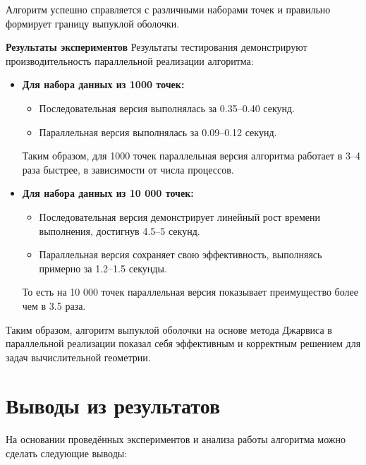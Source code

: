 \documentclass[a4paper,12pt]{article}
\begin{document}
Алгоритм успешно справляется с различными наборами точек и правильно формирует границу выпуклой оболочки.


\textbf{Результаты экспериментов}
Результаты тестирования демонстрируют производительность параллельной реализации алгоритма:

\begin{itemize}
    \item \textbf{Для набора данных из 1000 точек:}
    \begin{itemize}
        \item Последовательная версия выполнялась за 0.35–0.40 секунд.
        \item Параллельная версия выполнялась за 0.09–0.12 секунд.
    \end{itemize}
    Таким образом, для 1000 точек параллельная версия алгоритма работает в 3–4 раза быстрее, в зависимости от числа процессов.
    
    \item \textbf{Для набора данных из 10 000 точек:}
    \begin{itemize}
        \item Последовательная версия демонстрирует линейный рост времени выполнения, достигнув 4.5–5 секунд.
        \item Параллельная версия сохраняет свою эффективность, выполняясь примерно за 1.2–1.5 секунды.
    \end{itemize}
    То есть на 10 000 точек параллельная версия показывает преимущество более чем в 3.5 раза.
\end{itemize}

Таким образом, алгоритм выпуклой оболочки на основе метода Джарвиса в параллельной реализации показал себя эффективным и корректным решением для задач вычислительной геометрии.

\newpage

\section{Выводы из результатов}
На основании проведённых экспериментов и анализа работы алгоритма можно сделать следующие выводы:
\end{document}

